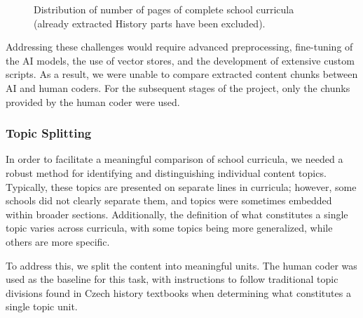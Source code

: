 \documentclass[]{interact}
\theoremstyle{plain}%
\theoremstyle{definition}
\theoremstyle{remark}
\begin{document}
\begin{figure} \centering {} \caption{Distribution of number of pages of complete school curricula (already extracted History parts have been excluded).} \label{figure:pages-distribution-plot} \end{figure}


Addressing these challenges would require advanced preprocessing, fine-tuning of the AI models, the use of vector stores, and the development of extensive custom scripts. As a result, we were unable to compare extracted content chunks between AI and human coders. For the subsequent stages of the project, only the chunks provided by the human coder were used.

\subsubsection{Topic Splitting}

In order to facilitate a meaningful comparison of school curricula, we needed a robust method for identifying and distinguishing individual content topics. Typically, these topics are presented on separate lines in curricula; however, some schools did not clearly separate them, and topics were sometimes embedded within broader sections. Additionally, the definition of what constitutes a single topic varies across curricula, with some topics being more generalized, while others are more specific.

To address this, we split the content into meaningful units. The human coder was used as the baseline for this task, with instructions to follow traditional topic divisions found in Czech history textbooks when determining what constitutes a single topic unit.
\end{document}
